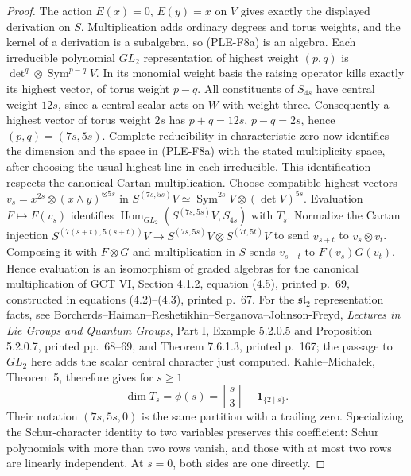 \documentclass[11pt,a4paper]{article}
\begin{document}
\begin{proof}
The action $E(x)=0$, $E(y)=x$ on $V$ gives exactly the displayed
derivation on $S$. Multiplication adds ordinary degrees and torus
weights, and the kernel of a derivation is a subalgebra, so (PLE-F8a)
is an algebra. Each irreducible polynomial $GL_2$ representation of
highest weight $(p,q)$ is $\det^q\otimes\operatorname{Sym}^{p-q}V$.
In its monomial weight basis the raising operator kills exactly its
highest vector, of torus weight $p-q$. All constituents of $S_{4s}$
have central weight $12s$, since a central scalar acts on $W$ with
weight three. Consequently a highest vector of torus weight $2s$
has $p+q=12s$, $p-q=2s$, hence $(p,q)=(7s,5s)$.
Complete reducibility in characteristic zero now identifies the
dimension and the space in (PLE-F8a) with the stated multiplicity
space, after choosing the usual highest line in each irreducible.
This identification respects the canonical Cartan multiplication.
Choose compatible highest vectors
$v_s=x^{2s}\otimes(x\wedge y)^{\otimes5s}$ in
$S^{(7s,5s)}V\simeq\operatorname{Sym}^{2s}V\otimes(\det V)^{5s}$.
Evaluation $F\mapsto F(v_s)$ identifies
$\operatorname{Hom}_{GL_2}(S^{(7s,5s)}V,S_{4s})$ with $T_s$.
Normalize the Cartan injection
$S^{(7(s+t),5(s+t))}V\to
 S^{(7s,5s)}V\otimes S^{(7t,5t)}V$
to send $v_{s+t}$ to $v_s\otimes v_t$.
Composing it with $F\otimes G$ and multiplication in $S$ sends
$v_{s+t}$ to $F(v_s)G(v_t)$. Hence evaluation is an isomorphism
of graded algebras for the canonical multiplication of GCT VI,
Section 4.1.2, equation (4.5), printed p.~69, constructed in
equations (4.2)--(4.3), printed p.~67.
For the $\mathfrak{sl}_2$ representation facts, see
Borcherds--Haiman--Reshetikhin--Serganova--Johnson-Freyd,
\emph{Lectures in Lie Groups and Quantum Groups}, Part I,
Example 5.2.0.5 and Proposition 5.2.0.7, printed pp.~68--69,
and Theorem 7.6.1.3, printed p.~167; the passage to $GL_2$ here
adds the scalar central character just computed.
Kahle--Micha\l ek, Theorem 5, therefore gives for $s\ge1$
\[
 \dim T_s=\phi(s)=\left\lfloor\frac{s}{3}\right\rfloor
                      +\mathbf1_{\{2\mid s\}}.
 \tag{PLE-F8d}
\]
Their notation $(7s,5s,0)$ is the same partition with a trailing
zero. Specializing the Schur-character identity to two variables
preserves this coefficient: Schur polynomials with more than two
rows vanish, and those with at most two rows are linearly independent.
At $s=0$, both sides are one directly.


\end{proof}
\end{document}
